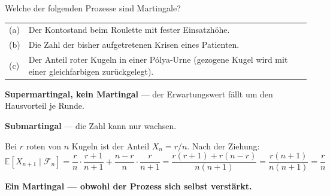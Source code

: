 \begin{aufgabe}
Welche der folgenden Prozesse sind Martingale?
\begin{center}
{\small
\renewcommand{\arraystretch}{1.5}
\begin{tabular}{@{}P{1.0cm}P{7.4cm}@{}}
\toprule
(a) & Der Kontostand beim Roulette mit fester Einsatzhöhe.\\
(b) & Die Zahl der bisher aufgetretenen Krisen eines Patienten.\\
(c) & Der Anteil roter Kugeln in einer Pólya-Urne (gezogene Kugel wird mit einer gleichfarbigen zurückgelegt).\\
\bottomrule
\end{tabular}}
\end{center}

\loesung
{}
\begin{center}
\begin{minipage}{0.9\textwidth}
\textbf{Supermartingal, kein Martingal} --- der Erwartungswert fällt um den Hausvorteil je Runde.
\end{minipage}
\end{center}

\begin{center}
\begin{minipage}{0.9\textwidth}
\textbf{Submartingal} --- die Zahl kann nur wachsen.
\end{minipage}
\end{center}

Bei $r$ roten von $n$ Kugeln ist der Anteil $X_n = r/n$. Nach der Ziehung:
\[ \mathbb{E}[X_{n+1} \mid \mathcal F_n] = \frac{r}{n}\cdot\frac{r+1}{n+1} + \frac{n-r}{n}\cdot\frac{r}{n+1} = \frac{r(r+1)+r(n-r)}{n(n+1)} = \frac{r(n+1)}{n(n+1)} = \frac{r}{n} \]

\begin{center}
\begin{minipage}{0.9\textwidth}
\textbf{Ein Martingal --- obwohl der Prozess sich selbst verstärkt.}
\end{minipage}
\end{center}

\begin{center}
\begin{minipage}{0.88\textwidth}
\end{minipage}
\end{center}
\end{aufgabe}

